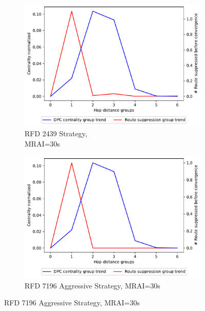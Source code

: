 \begin{figure}[H]
\begin{subfigure}[b]{0.325\textwidth}
     \end{subfigure}
     \vfill
     \begin{subfigure}[b]{0.325\textwidth}
         \centering
         \includegraphics[width=\textwidth]{images/RFD/miceVSelephants/MultiMRAI/30/elephants/cisco_1000_RFD_nodeConvergence_centVSsup_trend.pdf}
         \caption{RFD 2439 Strategy, \\MRAI=30s}
         \label{fig:1000_2439RFD_centVSsup_elephants}
     \end{subfigure}
     \hfill
     \begin{subfigure}[b]{0.325\textwidth}
         \centering
         \includegraphics[width=\textwidth]{images/RFD/miceVSelephants/MultiMRAI/30/elephants/cisco_1000_RFD_7196_aggressive_nodeConvergence_centVSsup_trend.pdf}
         \caption{RFD 7196 Aggressive Strategy, MRAI=30s}
         \label{fig:1000_7196RFDA_centVSsup_elephants}

\end{subfigure}
\end{figure}
